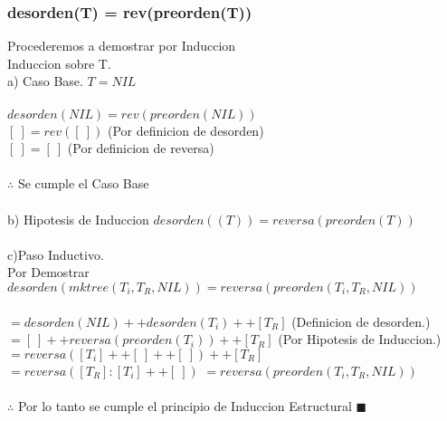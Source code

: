 \documentclass[11pt,letterpaper]{article}
\begin{document}
      \subsubsection{desorden(T) = rev(preorden(T))}
         Procederemos a demostrar por Induccion\\
         Induccion sobre T.\\
         a) Caso Base. $T = NIL$\\ \\
         $desorden(NIL) = rev(preorden(NIL))$ \\
         $[\ ] = rev([\ ])$ \hspace{1cm} (Por definicion de desorden)\\
         $[\ ] = [\ ]$ \hspace{1cm} (Por definicion de reversa)\\ \\
         $\therefore$ Se cumple el Caso Base \\ \\
         b) Hipotesis de Induccion $desorden((T)) = reversa(preorden(T))$ \\ \\
         c)Paso Inductivo. \\
         Por Demostrar $desorden(mktree(T_{i}, T_{R}, NIL)) = reversa(preorden(T_{i}, T_{R}, NIL))$ \\ \\
         $ =  desorden(NIL) + + desorden(T_{i}) + + [T_{R}]$ \hspace{1cm} (Definicion de desorden.) \\
         $ = [\ ] + + reversa(preorden(T_{i})) + + [T_{R}]$ \hspace{1cm} (Por Hipotesis de Induccion.) \\
         $ = reversa([T_{i}]   + + [\ ] + + [\ ]) + + [T_{R}]$ \\
         $ = reversa([T_{R}]:[T_{i}] + + [\ ])$
         $ = reversa(preorden(T_{i},T_{R},NIL))$ \\ \\
         $\therefore$ Por lo tanto se cumple el principio de Induccion Estructural $ \blacksquare$
\end{document}
